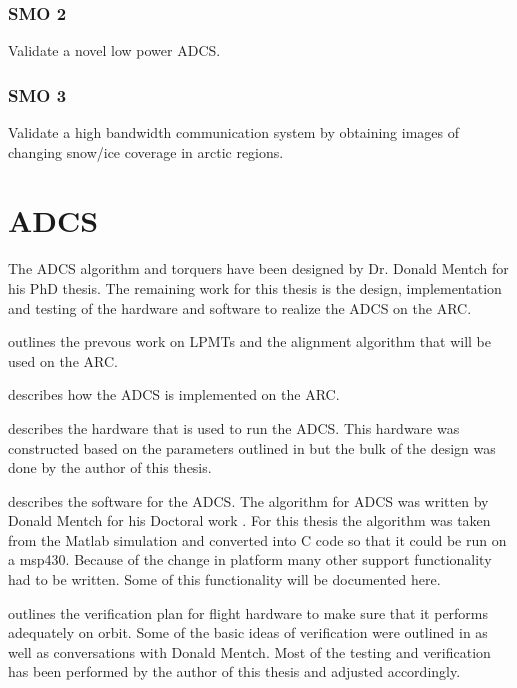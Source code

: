 \subsubsection{\acl{SMO} 2}

Validate a novel low power \ac{ADCS}.

\subsubsection{\acl{SMO} 3}

Validate a high bandwidth communication system by obtaining images of changing snow/ice coverage in arctic regions.

\section{\acl{ADCS}}

The \ac{ADCS} algorithm and torquers have been designed by Dr. Donald Mentch for his PhD thesis. The remaining work for this thesis is the design, implementation and testing of the hardware and software to realize the \ac{ADCS} on the \ac{ARC}.

 outlines the prevous work on \acp{LPMT} and the alignment algorithm that will be used on the \ac{ARC}.

 describes how the \ac{ADCS} is implemented on the \ac{ARC}. 

 describes the hardware that is used to run the \ac{ADCS}. This hardware was constructed based on the parameters outlined in \cite{Mentch11} but the bulk of the design was done by the author of this thesis.

 describes the software for the \ac{ADCS}. The algorithm for \ac{ADCS} was written by Donald Mentch for his Doctoral work \cite{Mentch11}. For this thesis the algorithm was taken from the Matlab simulation and converted into C code so that it could be run on a msp430. Because of the change in platform many other support functionality had to be written. Some of this functionality will be documented here.

 outlines the verification plan for flight hardware to make sure that it performs adequately on orbit. Some of the basic ideas of verification were outlined in \cite{Mentch11} as well as conversations with Donald Mentch. Most of the testing and verification has been performed by the author of this thesis and adjusted accordingly.

